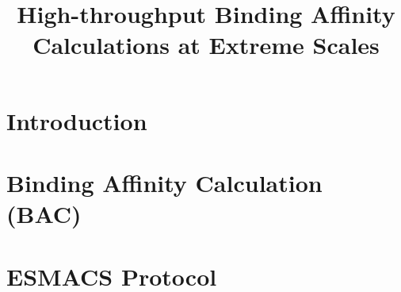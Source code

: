 \documentclass[conference]{IEEEtran}
\begin{document}
\title{High-throughput Binding Affinity Calculations at Extreme Scales}

\author{
}


\maketitle
\begin{abstract}

\end{abstract}


\section{Introduction}
\label{sec:intro}



\section{Binding Affinity Calculation (BAC)}
\label{sec:1}



\section{ESMACS Protocol}
\label{sec:2}

\end{document}
